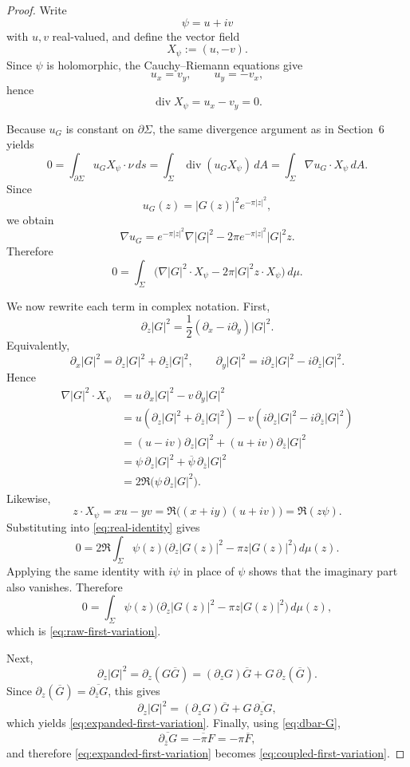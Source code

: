 \documentclass[11pt]{article}
\newcommand{\dA}{\,dA}
\newcommand{\dmu}{\,d\mu}
\newcommand{\pw}{\partial_z}
\newcommand{\pwb}{\partial_{\bar z}}
\newcommand{\1}{\mathbf 1}
\newcommand{\abs}[1]{\left|#1\right|}
\begin{document}
\begin{proof}
Write
\[
\psi=u+iv
\]
with \(u,v\) real-valued, and define the vector field
\[
X_\psi:=(u,-v).
\]
Since \(\psi\) is holomorphic, the Cauchy--Riemann equations give
\[
u_x=v_y,
\qquad
u_y=-v_x,
\]
hence
\[
\operatorname{div}X_\psi=u_x-v_y=0.
\]

Because \(u_G\) is constant on \(\partial\Sigma\), the same divergence argument as in
Section~6 yields
\[
0
=
\int_{\partial\Sigma} u_G X_\psi\cdot \nu\,ds
=
\int_\Sigma \operatorname{div}(u_G X_\psi)\dA
=
\int_\Sigma \nabla u_G\cdot X_\psi\dA.
\]
Since
\[
u_G(z)=\abs{G(z)}^2 e^{-\pi\abs{z}^2},
\]
we obtain
\[
\nabla u_G
=
e^{-\pi\abs{z}^2}\nabla\abs{G}^2
-2\pi e^{-\pi\abs{z}^2}\abs{G}^2 z.
\]
Therefore
\begin{equation}\label{eq:real-identity}
0
=
\int_\Sigma
\Big(\nabla\abs{G}^2\cdot X_\psi
-2\pi \abs{G}^2 z\cdot X_\psi\Big)\dmu.
\end{equation}

We now rewrite each term in complex notation. First,
\[
\pw\abs{G}^2
=
\frac12(\partial_x-i\partial_y)\abs{G}^2.
\]
Equivalently,
\[
\partial_x\abs{G}^2
=
\pw\abs{G}^2+\pwb\abs{G}^2,
\qquad
\partial_y\abs{G}^2
=
i\pw\abs{G}^2-i\pwb\abs{G}^2.
\]
Hence
\begin{align*}
\nabla\abs{G}^2\cdot X_\psi
&=
u\,\partial_x\abs{G}^2-v\,\partial_y\abs{G}^2 \\
&=
u(\pw\abs{G}^2+\pwb\abs{G}^2)
-v(i\pw\abs{G}^2-i\pwb\abs{G}^2) \\
&=
(u-iv)\pw\abs{G}^2+(u+iv)\pwb\abs{G}^2 \\
&=
\psi\,\pw\abs{G}^2+\overline{\psi}\,\pwb\abs{G}^2 \\
&=
2\Re\!\big(\psi\,\pw\abs{G}^2\big).
\end{align*}
Likewise,
\[
z\cdot X_\psi
=
xu-yv
=
\Re\!\big((x+iy)(u+iv)\big)
=
\Re(z\psi).
\]
Substituting into \eqref{eq:real-identity} gives
\[
0
=
2\Re\!\int_\Sigma \psi(z)\Big(\pw\abs{G(z)}^2-\pi z\abs{G(z)}^2\Big)\dmu(z).
\]
Applying the same identity with \(i\psi\) in place of \(\psi\) shows that the
imaginary part also vanishes. Therefore
\[
0
=
\int_\Sigma \psi(z)\Big(\pw\abs{G(z)}^2-\pi z\abs{G(z)}^2\Big)\dmu(z),
\]
which is \eqref{eq:raw-first-variation}.

Next,
\[
\pw\abs{G}^2
=
\pw(G\overline G)
=
(\pw G)\overline G+G\,\pw(\overline G).
\]
Since \(\pw(\overline G)=\overline{\pwb G}\), this gives
\[
\pw\abs{G}^2
=
(\pw G)\overline G+G\,\overline{\pwb G},
\]
which yields \eqref{eq:expanded-first-variation}. Finally, using \eqref{eq:dbar-G},
\[
\overline{\pwb G}=\overline{-\pi F}=-\pi \overline F,
\]
and therefore \eqref{eq:expanded-first-variation} becomes
\eqref{eq:coupled-first-variation}.
\end{proof}
\end{document}
